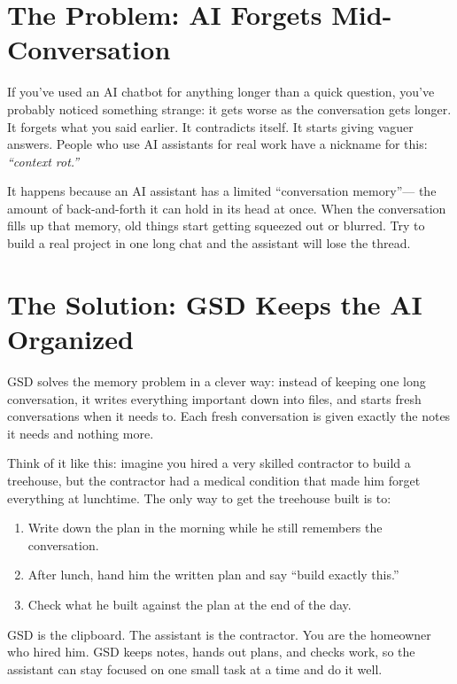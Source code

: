 \documentclass[11pt,letterpaper,openany]{book}
\begin{document}
\section{The Problem: AI Forgets Mid-Conversation}

If you've used an AI chatbot for anything longer than a quick question,
you've probably noticed something strange: it gets worse as the
conversation gets longer. It forgets what you said earlier. It contradicts
itself. It starts giving vaguer answers. People who use AI assistants for
real work have a nickname for this: \emph{``context rot.''}

It happens because an AI assistant has a limited ``conversation memory''---
the amount of back-and-forth it can hold in its head at once. When the
conversation fills up that memory, old things start getting squeezed out
or blurred. Try to build a real project in one long chat and the
assistant will lose the thread.

\section{The Solution: GSD Keeps the AI Organized}

GSD solves the memory problem in a clever way: instead of keeping one
long conversation, it writes everything important down into files, and
starts fresh conversations when it needs to. Each fresh conversation is
given exactly the notes it needs and nothing more.

Think of it like this: imagine you hired a very skilled contractor to
build a treehouse, but the contractor had a medical condition that made
him forget everything at lunchtime. The only way to get the treehouse
built is to:

\begin{enumerate}
  \item Write down the plan in the morning while he still remembers the
        conversation.
  \item After lunch, hand him the written plan and say ``build exactly
        this.''
  \item Check what he built against the plan at the end of the day.
\end{enumerate}

GSD is the clipboard. The assistant is the contractor. You are the
homeowner who hired him. GSD keeps notes, hands out plans, and checks work,
so the assistant can stay focused on one small task at a time and do it well.
\end{document}
